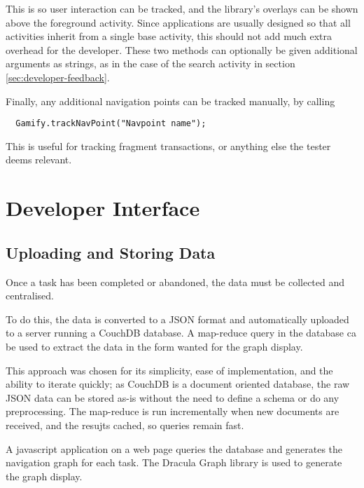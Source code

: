 This is so user interaction can be tracked, and the library's overlays can be
shown above the foreground activity. Since applications are usually designed so
that all activities inherit from a single base activity, this should not add
much extra overhead for the developer. These two methods can optionally be given 
additional arguments as strings, as in the case of the search activity in section
\ref{sec:developer-feedback}.

Finally, any additional navigation points can be tracked manually, by calling

\begin{verbatim}
  Gamify.trackNavPoint("Navpoint name");
\end{verbatim}

This is useful for tracking fragment transactions, or anything else the tester
deems relevant.

\section{Developer Interface}

\subsection{Uploading and Storing Data}

Once a task has been completed or abandoned, the data must be collected and centralised.

To do this, the data is converted to a JSON format and automatically uploaded to a server
running a CouchDB database. A map-reduce query in the database ca be used to extract the data
in the form wanted for the graph display.

This approach was chosen for its simplicity, ease of implementation, and the ability to iterate quickly;
as CouchDB is a document oriented database, the raw JSON data can be stored as-is without the need
to define a schema or do any preprocessing. The map-reduce is run incrementally when new documents are 
received, and the resujts cached, so queries remain fast.

A javascript application on a web page queries the database and generates the navigation graph for
each task. The Dracula Graph library \cite{dracula-graph} is used to generate the graph display.